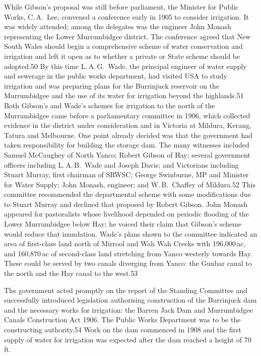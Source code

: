 While Gibson's proposal was still before parliament, the Minister for
Public Works, C.\,A.~Lee, convened a conference early in 1905 to
consider irrigation.  It was widely attended; among the delegates was
the engineer John Monash representing the Lower Murrumbidgee district.
The conference agreed that New South Wales should begin a
comprehensive scheme of water conservation and irrigation and left it
open as to whether a private or State scheme should be adopted.50 By
this time L.\,A.\,G.~Wade, the principal engineer of water supply and
sewerage in the public works department, had visited USA to study
irrigation and was preparing plans for the Burrinjuck reservoir on the
Murrumbidgee and the use of its water for irrigation beyond the
highlands.51 Both Gibson's and Wade's schemes for irrigation to the
north of the Murrumbidgee came before a parliamentary committee in
1906, which collected evidence in the district under consideration and
in Victoria at Mildura, Kerang, Tatura and Melbourne.  One point
already decided was that the government had taken responsibility for
building the storage dam.  The many witnesses included Samuel
McCaughey of North Yanco; Robert Gibson of Hay; several government
officers including L.\,A.\,B.~Wade and Joseph Davis; and Victorians
including Stuart Murray, first chairman of SRWSC; George Swinburne, MP
and Minister for Water Supply; John Monash, engineer; and
W.\,B.~Chaffey of Mildura.52 This committee recommended the
departmental scheme with some modifications due to Stuart Murray and
declined that proposed by Robert Gibson.  John Monash appeared for
pastoralists whose livelihood depended on periodic flooding of the
Lower Murrumbidgee below Hay; he voiced their claim that Gibson's
scheme would reduce that inundation. Wade's plans shown to the
committee indicated an area of first-class land north of Mirrool and
Wah Wah Creeks with 196,000\,ac, and 160,870\,ac of second-class land
stretching from Yanco westerly towards Hay. These could be served by
two canals diverging from Yanco: the Gunbar canal to the north and the
Hay canal to the west.53

The government acted promptly on the report of the Standing Committee
and successfully introduced legislation authorising construction of
the Burrinjuck dam and the necessary works for irrigation: the Barren
Jack Dam and Murrumbidgee Canals Construction Act 1906.  The Public
Works Department was to be the constructing authority.54 Work on the
dam commenced in 1908 and the first supply of water for irrigation was
expected after the dam reached a height of 70\,ft.

